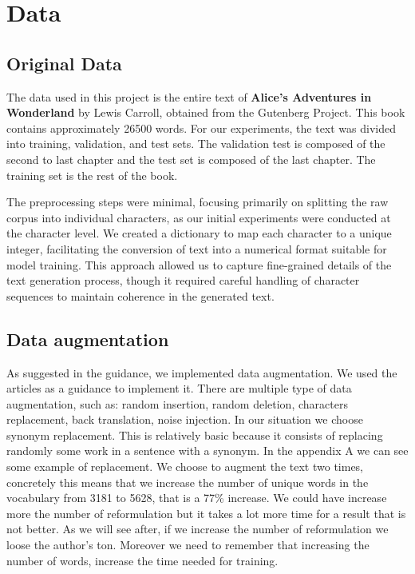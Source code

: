 \documentclass{article}
\begin{document}
\section{Data}

\subsection{Original Data}

The data used in this project is the entire text of \textbf{Alice's Adventures in Wonderland} by Lewis Carroll, obtained from the Gutenberg Project. This book contains approximately 26500 words. For our experiments, the text was divided into training, validation, and test sets. The validation test is composed of the second to last chapter and the test set is composed of the last chapter. The training set is the rest of the book.

The preprocessing steps were minimal, focusing primarily on splitting the raw corpus into individual characters, as our initial experiments were conducted at the character level. We created a dictionary to map each character to a unique integer, facilitating the conversion of text into a numerical format suitable for model training. This approach allowed us to capture fine-grained details of the text generation process, though it required careful handling of character sequences to maintain coherence in the generated text.

\subsection{Data augmentation}

As suggested in the guidance, we implemented data augmentation. We used the articles \cite{kaggle} \cite{dataaug} as a guidance to implement it. There are multiple type of data augmentation, such as: random insertion, random deletion, characters replacement, back translation, noise injection. In our situation we choose synonym replacement. This is relatively basic because it consists of replacing randomly some work in a sentence with a synonym. In the appendix A we can see some example of replacement. We choose to augment the text two times, concretely this means that we increase the number of unique words in the vocabulary from 3181 to 5628, that is a 77\%  increase. We could have increase more the number of reformulation but it takes a lot more time for a result that is not better. As we will see after, if we increase the number of reformulation we loose the author's ton. Moreover we need to remember that increasing the number of words, increase the time needed for training.
\end{document}
